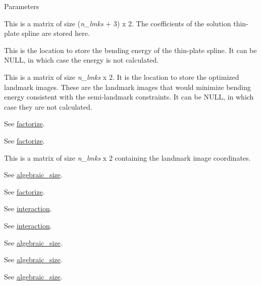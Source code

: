 \begin{DoxyParams}{Parameters}
\item[\mbox{\tt[out]} {\em spline}]This is a matrix of size ({\itshape n\_\-lmks\/} + 3) x 2. The coefficients of the solution thin-\/plate spline are stored here. \item[\mbox{\tt[out]} {\em energy\_\-opt}]This is the location to store the bending energy of the thin-\/plate spline. It can be {\ttfamily NULL}, in which case the energy is not calculated. \item[\mbox{\tt[out]} {\em relax\_\-lmk\_\-images\_\-opt}]This is a matrix of size {\itshape n\_\-lmks\/} x 2. It is the location to store the optimized landmark images. These are the landmark images that would minimize bending energy consistent with the semi-\/landmark constraints. It can be {\ttfamily NULL}, in which case they are not calculated. \item[\mbox{\tt[in]} {\em F}]See \hyperlink{classew_1_1Tps2_a07f500b8a093d45384ee6d90dd2c226a}{factorize}. \item[\mbox{\tt[in]} {\em pivots}]See \hyperlink{classew_1_1Tps2_a07f500b8a093d45384ee6d90dd2c226a}{factorize}. \item[\mbox{\tt[in]} {\em lmk\_\-images}]This is a matrix of size {\itshape n\_\-lmks\/} x 2 containing the landmark image coordinates. \item[\mbox{\tt[in]} {\em relax\_\-dims\_\-opt}]See \hyperlink{classew_1_1Tps2_a448c7039e42cb7fad800461bacc48c72}{algebraic\_\-size}. \item[\mbox{\tt[in]} {\em relax\_\-params\_\-opt}]See \hyperlink{classew_1_1Tps2_a07f500b8a093d45384ee6d90dd2c226a}{factorize}. \item[\mbox{\tt[in]} {\em L}]See \hyperlink{classew_1_1Tps2_a7f04e98fa574f821257e904658b2bb8b}{interaction}. \item[\mbox{\tt[in]} {\em n\_\-lmks}]See \hyperlink{classew_1_1Tps2_a7f04e98fa574f821257e904658b2bb8b}{interaction}. \item[\mbox{\tt[in]} {\em f\_\-size}]See \hyperlink{classew_1_1Tps2_a448c7039e42cb7fad800461bacc48c72}{algebraic\_\-size}. \item[\mbox{\tt[in]} {\em is\_\-mixed}]See \hyperlink{classew_1_1Tps2_a448c7039e42cb7fad800461bacc48c72}{algebraic\_\-size}. \item[\mbox{\tt[in]} {\em is\_\-reduced}]See \hyperlink{classew_1_1Tps2_a448c7039e42cb7fad800461bacc48c72}{algebraic\_\-size}. \end{DoxyParams}

